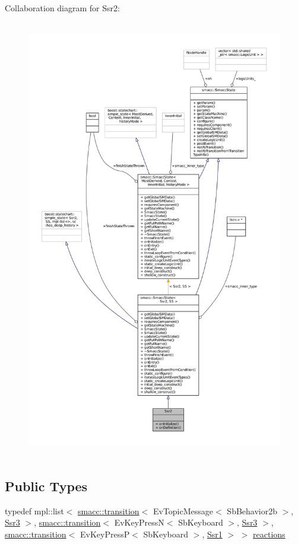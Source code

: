Collaboration diagram for Ssr2\+:
\nopagebreak
\begin{figure}[H]
\begin{center}
\leavevmode
\includegraphics[height=550pt]{structSsr2__coll__graph}
\end{center}
\end{figure}
\subsection*{Public Types}
\begin{DoxyCompactItemize}
\item 
typedef mpl\+::list$<$ \hyperlink{classsmacc_1_1transition}{smacc\+::transition}$<$ Ev\+Topic\+Message$<$ Sb\+Behavior2b $>$, \hyperlink{structSsr3}{Ssr3} $>$, \hyperlink{classsmacc_1_1transition}{smacc\+::transition}$<$ Ev\+Key\+PressN$<$ Sb\+Keyboard $>$, \hyperlink{structSsr3}{Ssr3} $>$, \hyperlink{classsmacc_1_1transition}{smacc\+::transition}$<$ Ev\+Key\+PressP$<$ Sb\+Keyboard $>$, \hyperlink{structSsr1}{Ssr1} $>$ $>$ \hyperlink{structSsr2_a1256e60dc7ca7df354864b8ebf9a5140}{reactions}
\end{DoxyCompactItemize}
